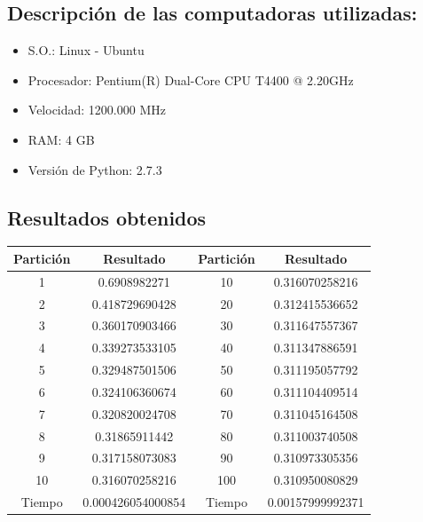 \documentclass{article}
\begin{document}
    \subsection{Descripción de las computadoras utilizadas:}

      \begin{itemize}
        \item S.O.: Linux - Ubuntu
        \item Procesador: Pentium(R) Dual-Core CPU  T4400  @ 2.20GHz
        \item Velocidad: 1200.000 MHz
        \item RAM: 4 GB
        \item Versión de Python: 2.7.3
      \end{itemize}

    \subsection{Resultados obtenidos}

     \begin{tabular}{|c|c|c|c|}
      \hline
      Partición & Resultado & Partición & Resultado\\
      \hline
      1 & 0.6908982271 & 10 & 0.316070258216\\
      \hline
      2 & 0.418729690428 & 20 & 0.312415536652\\ 
      \hline
      3 & 0.360170903466 & 30 & 0.311647557367\\
      \hline
      4 & 0.339273533105 & 40 & 0.311347886591\\
      \hline
      5 & 0.329487501506 & 50 & 0.311195057792\\
      \hline
      6 & 0.324106360674 & 60 & 0.311104409514\\
      \hline
      7 & 0.320820024708 & 70 & 0.311045164508\\
      \hline
      8 & 0.31865911442 & 80 & 0.311003740508\\
      \hline
      9 & 0.317158073083 & 90 & 0.310973305356\\
      \hline
      10 & 0.316070258216 & 100 & 0.310950080829\\
      \hline
      Tiempo & 0.000426054000854 & Tiempo & 0.00157999992371\\ \hline
     \end{tabular}
\end{document}
